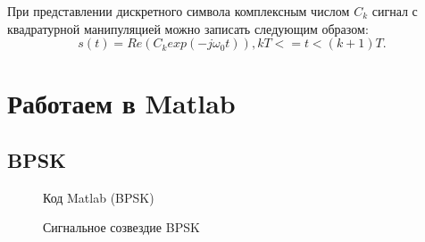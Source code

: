 \documentclass[12pt,a4paper]{scrartcl}
\begin{document}
При представлении дискретного символа комплексным числом $C_k$ сигнал с квадратурной манипуляцией можно записать следующим образом: $$s(t)=Re(C_k exp(-j \omega_0 t)), kT<=t<(k+1)T.$$ 

\clearpage
\newpage
\section{Работаем в Matlab}
\label{sec:AM}

\subsection{BPSK}
\label{sec:BPSK}
\begin{figure}[h!]
\caption{Код Matlab (BPSK)}
\end{figure}

\begin{figure}[h!]
\caption{Сигнальное созвездие BPSK}
\end{figure}
\end{document}
